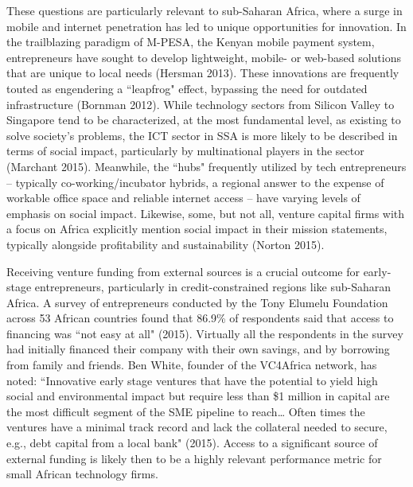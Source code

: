 \documentclass[12pt]{article}
\begin{document}
These questions are particularly relevant to sub-Saharan Africa, where a surge in mobile and internet penetration has led to unique opportunities for innovation. In the trailblazing paradigm of M-PESA, the Kenyan mobile payment system, entrepreneurs have sought to develop lightweight, mobile- or web-based solutions that are unique to local needs (Hersman 2013). These innovations are frequently touted as engendering a ``leapfrog" effect, bypassing the need for outdated infrastructure (Bornman 2012). While technology sectors from Silicon Valley to Singapore tend to be characterized, at the most fundamental level, as existing to solve society’s problems, the ICT sector in SSA is more likely to be described in terms of social impact, particularly by multinational players in the sector (Marchant 2015). Meanwhile, the ``hubs" frequently utilized by tech entrepreneurs -- typically co-working/incubator hybrids, a regional answer to the expense of workable office space and reliable internet access -- have varying levels of emphasis on social impact. Likewise, some, but not all, venture capital firms with a focus on Africa explicitly mention social impact in their mission statements, typically alongside profitability and sustainability (Norton 2015).

Receiving venture funding from external sources is a crucial outcome for early-stage entrepreneurs, particularly in credit-constrained regions like sub-Saharan Africa. A survey of entrepreneurs conducted by the Tony Elumelu Foundation across 53 African countries found that 86.9\% of respondents said that access to financing was ``not easy at all" (2015). Virtually all the respondents in the survey had initially financed their company with their own savings, and by borrowing from family and friends. Ben White, founder of the VC4Africa network, has noted: ``Innovative early stage ventures that have the potential to yield high social and environmental impact but require less than \$1 million in capital are the most difficult segment of the SME pipeline to reach… Often times the ventures have a minimal track record and lack the collateral needed to secure, e.g., debt capital from a local bank" (2015). Access to a significant source of external funding is likely then to be a highly relevant performance metric for small African technology firms. 
\end{document}
